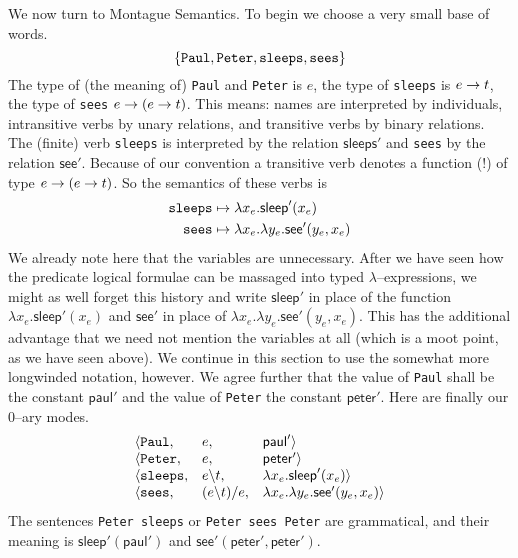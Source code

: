 We now turn to Montague Semantics. To begin we choose a very small 
base of words. 
\begin{equation}
\{\mbox{\tt Paul}, \mbox{\tt Peter}, \mbox{\tt sleeps},
\mbox{\tt sees}\}
\end{equation}
The type of (the meaning of) {\tt Paul} and {\tt Peter} is $e$, the 
type of {\tt sleeps} is $e \rightarrow t$, the type of {\tt sees} 
$e \rightarrow (e \rightarrow t)$. This means: names are interpreted by individuals, 
intransitive verbs by unary relations, and transitive verbs by binary 
relations. The (finite) verb {\tt sleeps} is interpreted by the 
relation $\textsf{sleeps}'$ and {\tt sees} by the relation 
$\textsf{see}'$. Because of our convention a transitive verb 
denotes a function (!) of type $e \rightarrow (e \rightarrow t)$. So the semantics 
of these verbs is
\begin{align}
\mbox{\tt sleeps} & \mapsto \lambda x_e . \textsf{sleep}'(x_e) \\
\mbox{\tt sees} & \mapsto \lambda x_e. \lambda y_e. \mbox{\sf %
    see}'(y_e, x_e)
\end{align}
We already note here that the variables are unnecessary. After
we have seen how the predicate logical formulae can be massaged
into typed $\lambda$--expressions, we might as well forget this
history and write $\textsf{sleep}'$ in place of the function
$\lambda x_e.\textsf{sleep}'(x_e)$ and $\textsf{see}'$ in
place of $\lambda x_e.\lambda y_e.\textsf{see}'(y_e,x_e)$.
This has the additional advantage that we need not mention the
variables at all (which is a moot point, as we have seen above).
We continue in this section to use the somewhat more longwinded
notation, however. We agree further that the value of {\tt Paul} 
shall be the constant $\textsf{paul}'$ and the value of 
{\tt Peter} the constant $\textsf{peter}'$. Here are finally 
our 0--ary modes.
\begin{equation}
\begin{array}{lll}
\langle \mbox{\tt Paul}, & e, & \textsf{paul}'\rangle \\
\langle \mbox{\tt Peter}, & e, & \textsf{peter}'\rangle \\
\langle \mbox{\tt sleeps}, & e\backslash t, & \lambda x_e.
    \textsf{sleep}'(x_e)\rangle \\
\langle \mbox{\tt sees}, & (e\backslash t)/e, &
    \lambda x_e. \lambda y_e. \mbox{\sf see}'(y_e, x_e)\rangle
\end{array}
\end{equation}
The sentences {\tt Peter sleeps} or {\tt Peter sees Peter}
are grammatical, and their meaning is $\textsf{sleep}'(\textsf{paul}')$ and
$\textsf{see}'(\textsf{peter}', \textsf{peter}')$.

